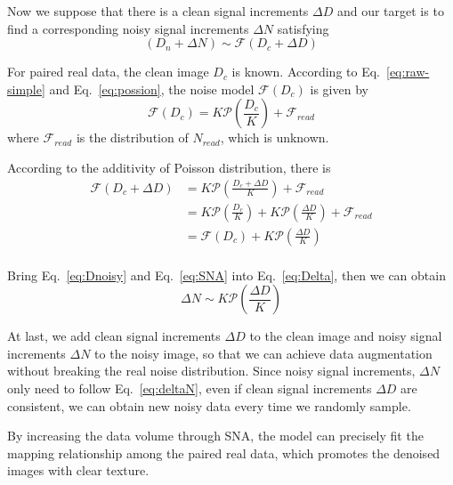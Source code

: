 \documentclass[sigconf,screen,nonacm]{acmart}
\begin{document}
    Now we suppose that there is a clean signal increments $\Delta D$ and our target is to find a corresponding noisy signal increments $\Delta N$ satisfying
    \begin{equation}\label{eq:Delta}
        (D_{n} + \Delta N) \sim \mathcal F(D_{c} + \Delta D)
    \end{equation}

    For paired real data, the clean image $D_{c}$ is known.
    According to Eq.~\eqref{eq:raw-simple} and Eq.~\eqref{eq:possion}, the noise model $\mathcal F(D_{c})$ is given by
    \begin{equation}\label{eq:noise model}
        \mathcal F(D_{c}) = K \mathcal P(\frac{D_{c}}{K}) + \mathcal F_{read}
    \end{equation}
    where $\mathcal F_{read}$ is the distribution of $N_{read}$, which is unknown.

    According to the additivity of Poisson distribution, there is
    \begin{equation}\label{eq:SNA}
        \begin{aligned}
            \mathcal F(D_{c} + \Delta D) &= K \mathcal P(\frac{D_{c} + \Delta D}{K}) + \mathcal F_{read} \\
            &= K \mathcal P(\frac{D_{c}}{K}) + K \mathcal P(\frac{\Delta D}{K}) + \mathcal F_{read} \\
            &= \mathcal F(D_{c}) + K \mathcal P(\frac{\Delta D}{K})\\
        \end{aligned}
    \end{equation}

    Bring Eq.~\eqref{eq:Dnoisy} and Eq.~\eqref{eq:SNA} into Eq.~\eqref{eq:Delta}, then we can obtain
    \begin{equation}
        \label{eq:deltaN}
        \Delta N \sim K \mathcal P(\frac{\Delta D}{K})
    \end{equation}

    At last, we add clean signal increments $\Delta D$ to the clean image and noisy signal increments $\Delta N$ to the noisy image, so that we can achieve data augmentation without breaking the real noise distribution. Since noisy signal increments, $\Delta N$ only need to follow Eq.~\eqref{eq:deltaN}, even if clean signal increments $\Delta D$ are consistent, we can obtain new noisy data every time we randomly sample.

    By increasing the data volume through SNA, the model can precisely fit the mapping relationship among the paired real data, which promotes the denoised images with clear texture.
\end{document}
